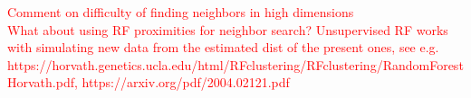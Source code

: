 \textcolor{red}{Comment on difficulty of finding neighbors in high dimensions}
\\
\textcolor{red}{What about using RF proximities for neighbor search? 
Unsupervised RF works with simulating new data from the estimated dist of the 
present ones, see e.g. https://horvath.genetics.ucla.edu/html/RFclustering/RFclustering/RandomForestHorvath.pdf, https://arxiv.org/pdf/2004.02121.pdf}

